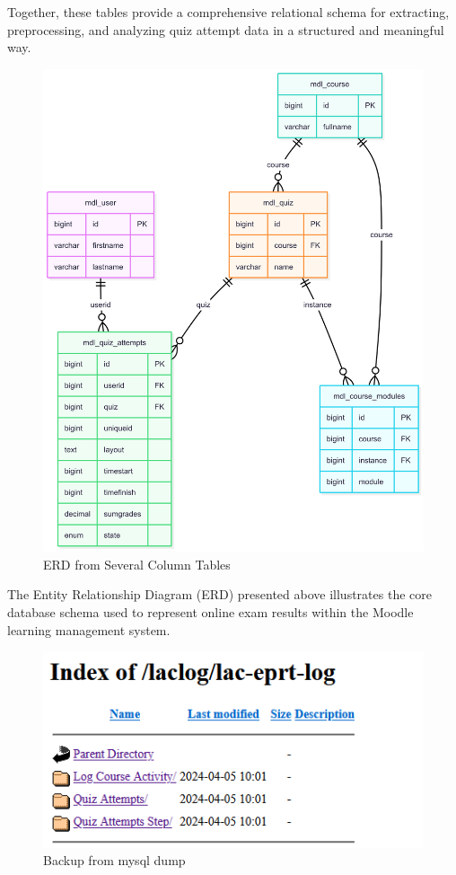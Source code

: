 Together, these tables provide a comprehensive relational schema for extracting, preprocessing, and analyzing quiz attempt data in a structured and meaningful way.
\begin{figure}[H] 
    \centering
    \includegraphics[width=14cm]{figure/erd-database-quiz-attempts.png}
    \caption{ERD from Several Column Tables}
    \label{fig:erd-tables}
\end{figure}
The Entity Relationship Diagram (ERD) presented above illustrates the core database schema used to represent online exam results within the Moodle learning management system.

\begin{figure}[H] 
    \centering
    \includegraphics[width=14cm]{figure/sandbox-log-eprt.png}
    \caption{Backup from mysql dump}
    \label{fig:sandbox-mysql-dump}
\end{figure}

